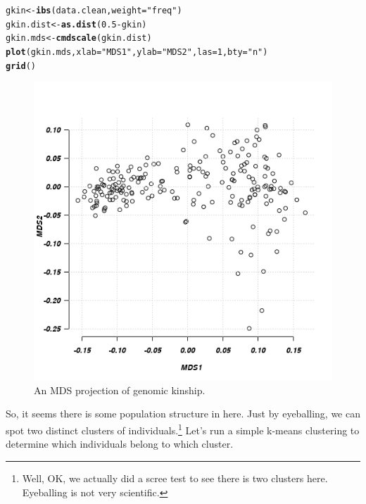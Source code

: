 \documentclass[12pt,a4paper,oneside]{article}\usepackage[]{graphicx}\usepackage[]{color}
\makeatletter
\newcommand{\hlnum}[1]{\textcolor[rgb]{0.686,0.059,0.569}{#1}}%
\newcommand{\hlstr}[1]{\textcolor[rgb]{0.192,0.494,0.8}{#1}}%
\newcommand{\hlopt}[1]{\textcolor[rgb]{0,0,0}{#1}}%
\newcommand{\hlstd}[1]{\textcolor[rgb]{0.345,0.345,0.345}{#1}}%
\newcommand{\hlkwb}[1]{\textcolor[rgb]{0.69,0.353,0.396}{#1}}%
\newcommand{\hlkwc}[1]{\textcolor[rgb]{0.333,0.667,0.333}{#1}}%
\newcommand{\hlkwd}[1]{\textcolor[rgb]{0.737,0.353,0.396}{\textbf{#1}}}%
\newenvironment{kframe}{%
 \def\at@end@of@kframe{}%
 \ifinner\ifhmode%
  \def\at@end@of@kframe{\end{minipage}}%
  \begin{minipage}{\columnwidth}%
 \fi\fi%
 \def\FrameCommand##1{\hskip\@totalleftmargin \hskip-\fboxsep
 \colorbox{shadecolor}{##1}\hskip-\fboxsep
     \hskip-\linewidth \hskip-\@totalleftmargin \hskip\columnwidth}%
 \MakeFramed {\advance\hsize-\width
   \@totalleftmargin\z@ \linewidth\hsize
   \@setminipage}}%
 {\par\unskip\endMakeFramed%
 \at@end@of@kframe}
\newenvironment{knitrout}{}{} %
\makeatother
\begin{document}
\begin{knitrout}\footnotesize
{}\color{fgcolor}\begin{kframe}
\begin{alltt}
\hlstd{gkin} \hlkwb{<-} \hlkwd{ibs}\hlstd{(data.clean,} \hlkwc{weight} \hlstd{=} \hlstr{"freq"}\hlstd{)}
\hlstd{gkin.dist} \hlkwb{<-} \hlkwd{as.dist}\hlstd{(}\hlnum{0.5} \hlopt{-} \hlstd{gkin)}
\hlstd{gkin.mds} \hlkwb{<-} \hlkwd{cmdscale}\hlstd{(gkin.dist)}
\hlkwd{plot}\hlstd{(gkin.mds,} \hlkwc{xlab} \hlstd{=} \hlstr{"MDS1"}\hlstd{,} \hlkwc{ylab} \hlstd{=} \hlstr{"MDS2"}\hlstd{,} \hlkwc{las} \hlstd{=} \hlnum{1}\hlstd{,} \hlkwc{bty} \hlstd{=} \hlstr{"n"}\hlstd{)}
\hlkwd{grid}\hlstd{()}
\end{alltt}
\end{kframe}\begin{figure}[]


{\centering \includegraphics[width=1.0\textwidth]{images/gkin} 

}

\caption[An MDS projection of genomic kinship]{An MDS projection of genomic kinship.\label{fig:gkin}}
\end{figure}


\end{knitrout}
So, it seems there is some population structure in here. Just by eyeballing, we can spot two distinct clusters of individuals.\footnote{Well, OK, we actually did a scree test to see there is two clusters here. Eyeballing is not very scientific.} Let's run a simple k-means clustering to determine which individuals belong to which cluster.
\end{document}
